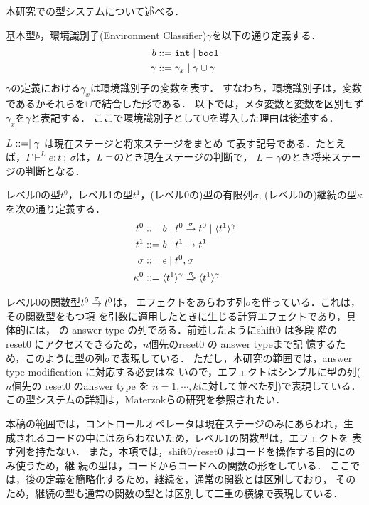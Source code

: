 本研究での型システムについて述べる．

基本型$b$，環境識別子(Environment Classifier)$\gamma$を以下の通り定義する．
\begin{align*}
  b & ::= \mbox{\texttt{int}} \mid \mbox{\texttt{bool}} \\
  \gamma & ::= \gamma_x \mid \gamma \cup \gamma
\end{align*}
$\gamma$の定義における$\gamma_x$は環境識別子の変数を表す．
すなわち，環境識別子は，変数であるかそれらを$\cup$で結合した形である．
以下では，メタ変数と変数を区別せず$\gamma_x$を$\gamma$と表記する．
ここで環境識別子として$\cup$を導入した理由は後述する．

$L ::= \empty \mid \gamma$ は現在ステージと将来ステージをまとめ
て表す記号である．たとえば，$\Gamma \vdash^L
e:t~;~\sigma$は，$L=\empty$のとき現在ステージの判断で，
$L=\gamma$のとき将来ステージの判断となる．

レベル0の型$t^0$，レベル1の型$t^1$，(レベル0の)型の有限列$\sigma$,
(レベル0の)継続の型$\kappa$を次の通り定義する．
\begin{align*}
  t^0 & ::= b \mid {t^0} \stackrel{\sigma}{\rightarrow} {t^0} \mid \langle{t^1}\rangle^{\gamma} \\
  t^1 & ::= b \mid t^1 \to t^1 \\
  \sigma & ::= \epsilon \mid t^0, \sigma \\
  \kappa^0 & ::= {\langle{t^1}\rangle^{\gamma}} \stackrel{\sigma}{\Rightarrow} {\langle{t^1}\rangle^{\gamma}}
\end{align*}

レベル0の関数型${t^0} \stackrel{\sigma}{\rightarrow} {t^0}$は，
エフェクトをあらわす列$\sigma$を伴っている．これは，その関数型をもつ項
を引数に適用したときに生じる計算エフェクトであり，具体的には，
\Shiftz の answer type の列である．前述したようにshift0 は多段
階の reset0 にアクセスできるため，$n$個先のreset0 の answer typeまで記
憶するため，このように型の列$\sigma$で表現している．
ただし，本研究の範囲では，answer type modification に対応する必要はな
いので，エフェクトはシンプルに型の列($n$個先の reset0 のanswer type を
$n=1,\cdots,k$に対して並べた列)で表現している．
この型システムの詳細は，Materzokら\cite{Materzok2011}の研究を参照されたい．

本稿の範囲では，コントロールオペレータは現在ステージのみにあらわれ，生
成されるコードの中にはあらわないため，レベル1の関数型は，エフェクトを
表す列を持たない．
また，本項では，shift0/reset0 はコードを操作する目的にのみ使うため，継
続の型は，コードからコードへの関数の形をしている．
ここでは，後の定義を簡略化するため，継続を，通常の関数とは区別しており，
そのため，継続の型も通常の関数の型とは区別して二重の横線で表現している．

